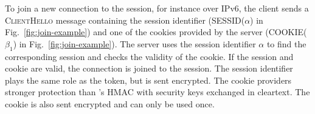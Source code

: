 To join a new \tcp connection to the \tcpls session, for instance over IPv6, the client
sends a \textsc{ClientHello} message containing the session identifier
(SESSID($\alpha$) in Fig.~\ref{fig:join-example}) and one of the
cookies provided by the server (COOKIE($\beta_1$) in Fig.~\ref{fig:join-example}). 
The server uses the session identifier $\alpha$ to find the corresponding \tcpls session
and checks the validity of the cookie. If the \tcpls session and cookie are valid, the \tcp
connection is joined to the \tcpls session. The session identifier plays the same role as the \mptcp token, but is sent encrypted. The cookie providers stronger protection than \mptcp's HMAC with security keys exchanged in cleartext. The cookie is also sent encrypted and can only be used once.



